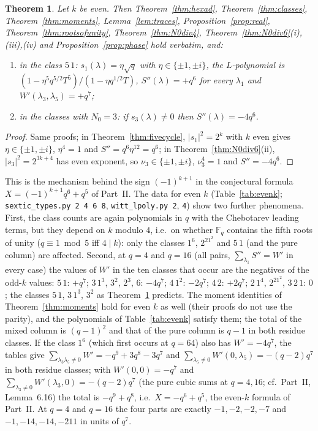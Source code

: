 \documentclass[12pt,a4paper]{amsart}
\newtheorem{theorem}{Theorem}[section]
\theoremstyle{definition}
\newcommand{\F}{\mathbb{F}}
\newcommand{\Spp}{S''}
\begin{document}
\begin{theorem}\label{thm:evenk}
Let $k$ be even. Then Theorem~\ref{thm:hexad}, Theorem~\ref{thm:classes}, Theorem~\ref{thm:moments}, Lemma~\ref{lem:traces}, Proposition~\ref{prop:real}, Theorem~\ref{thm:rootsofunity}, Theorem~\ref{thm:N0div4}, Theorem~\ref{thm:N0div6}\textup{(i),(iii),(iv)} and Proposition~\ref{prop:phase} hold verbatim, and:
\begin{enumerate}[label=\textup{(\roman*)},leftmargin=2em]
\item in the class $5\,1$: $s_1(\lambda)=\eta\sqrt q$ with $\eta\in\{\pm1,\pm i\}$, the $L$-polynomial is $(1-\eta^5q^{5/2}T^5)/(1-\eta q^{1/2}T)$, $\Spp(\lambda)=+q^6$ for every $\lambda_1$ and $W'(\lambda_3,\lambda_5)=+q^7$;
\item in the classes with $N_0=3$: if $s_3(\lambda)\ne0$ then $\Spp(\lambda)=-4q^6$.
\end{enumerate}
\end{theorem}
\begin{proof}
Same proofs; in Theorem~\ref{thm:fivecycle}, $|s_1|^2=2^k$ with $k$ even gives $\eta\in\{\pm1,\pm i\}$, $\eta^4=1$ and $\Spp=q^6\eta^{12}=q^6$; in Theorem~\ref{thm:N0div6}(ii), $|s_3|^2=2^{3k+4}$ has even exponent, so $\nu_3\in\{\pm1,\pm i\}$, $\nu_3^4=1$ and $\Spp=-4q^6$.
\end{proof}

This is the mechanism behind the sign $(-1)^{k+1}$ in the conjectural formula $X=(-1)^{k+1}q^6+q^5$ of Part~II. The data for even $k$ (Table~\ref{tab:evenk}; \texttt{sextic\_types.py 2 4 6 8}, \texttt{witt\_lpoly.py 2}, \texttt{4}) show two further phenomena. First, the class counts are again polynomials in $q$ with the Chebotarev leading terms, but they depend on $k$ modulo $4$, i.e.\ on whether $\F_q$ contains the fifth roots of unity ($q\equiv1\bmod5$ iff $4\mid k$): only the classes $1^6$, $2^21^2$ and $5\,1$ (and the pure column) are affected. Second, at $q=4$ and $q=16$ (all pairs, $\sum_{\lambda_1}\Spp=W'$ in every case) the values of $W'$ in the ten classes that occur are the negatives of the odd-$k$ values: $5\,1$: $+q^7$; $3\,1^3$, $3^2$, $2^3$, $6$: $-4q^7$; $4\,1^2$: $-2q^7$; $4\,2$: $+2q^7$; $2\,1^4$, $2^21^2$, $3\,2\,1$: $0$; the classes $5\,1$, $3\,1^3$, $3^2$ as Theorem~\ref{thm:evenk} predicts. The moment identities of Theorem~\ref{thm:moments} hold for even $k$ as well (their proofs do not use the parity), and the polynomials of Table~\ref{tab:evenk} satisfy them; the total of the mixed column is $(q-1)^2$ and that of the pure column is $q-1$ in both residue classes. If the class $1^6$ (which first occurs at $q=64$) also has $W'=-4q^7$, the tables give $\sum_{\lambda_3\lambda_5\ne0}W'=-q^9+3q^8-3q^7$ and $\sum_{\lambda_5\ne0}W'(0,\lambda_5)=-(q-2)q^7$ in both residue classes; with $W'(0,0)=-q^7$ and $\sum_{\lambda_3\ne0}W'(\lambda_3,0)=-(q-2)q^7$ (the pure cubic sums at $q=4,16$; cf.\ Part~II, Lemma~6.16) the total is $-q^9+q^8$, i.e.\ $X=-q^6+q^5$, the even-$k$ formula of Part~II. At $q=4$ and $q=16$ the four parts are exactly $-1,-2,-2,-7$ and $-1,-14,-14,-211$ in units of $q^7$.
\end{document}
